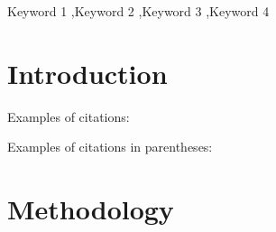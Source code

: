 \documentclass[a4paper,fleqn]{cas-sc}
\begin{document}












 

\begin{keywords}
Keyword 1 \sep Keyword 2 \sep Keyword 3 \sep Keyword 4
\end{keywords}

\maketitle 

\printcredits

\doublespacing


\section{Introduction}
\label{intro}



Examples of citations:

\cite{gomez1990isim3d, pebesma2004multivariable, hansen2018multiple}

Examples of citations in parentheses: 

\citep{gomez1990isim3d, pebesma2004multivariable, hansen2018multiple}

\section{Methodology}
\end{document}
